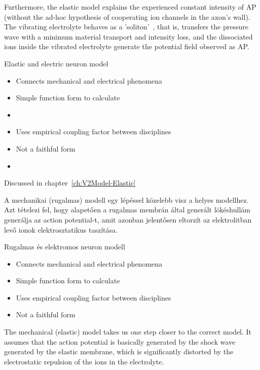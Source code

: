 Furthermore, the  elastic model explains the experienced constant intensity
of \gls{AP} (without the ad-hoc hypothesis of cooperating
ion channels in the axon's wall). The vibrating electrolyte 
behaves as a 'soliton'~\cite{SolitonPropagation:2005}, that is, transfers the pressure wave with a minimum material transport and intensity loss, and the dissociated ions inside the vibrated electrolyte generate the potential field observed as \gls{AP}.


\proconpanel
{Elastic and electric neuron model}
{
\begin{itemize}[noitemsep]
	\item Connects mechanical and electrical phenomena
	\item Simple function form to calculate
	\item 
\end{itemize}
}
{
\begin{itemize}[noitemsep]
	\item Uses empirical coupling factor between disciplines
	\item Not a faithful form
	\item 
\end{itemize}
}


Discussed in chapter~\ref{ch:V2Model-Elastic}

\else


A mechanikai (rugalmas) modell egy lépéssel közelebb visz a helyes modellhez. Azt tételezi fel, hogy alapetően a rugalmas membrán által generált lökéshullám generálja az action potential-t, amit azonban jelentősen eltorzít az elektrolitban levő ionok elektrosztatikus taszítása.

\proconpanel
{Rugalmas és elektromos neuron modell}
{
\begin{itemize}[noitemsep]
	\item Connects mechanical and electrical phenomena
	\item Simple function form to calculate
\end{itemize}
}
{
\begin{itemize}[noitemsep]
	\item Uses empirical coupling factor between disciplines
	\item Not a faithful form
\end{itemize}
}

The mechanical (elastic) model takes us one step closer to the correct model. It assumes that the action potential is basically generated by the shock wave generated by the elastic membrane, which is significantly distorted by the electrostatic repulsion of the ions in the electrolyte.


